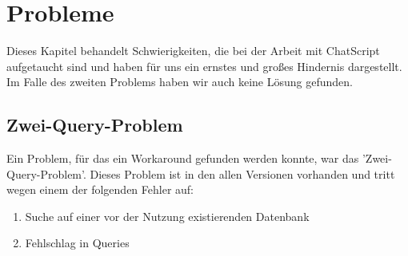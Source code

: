 \chapter{Probleme}
\label{sec:Probleme}

Dieses Kapitel behandelt Schwierigkeiten, die bei der Arbeit mit ChatScript aufgetaucht sind und haben für uns ein ernstes und großes Hindernis dargestellt. Im Falle des zweiten Problems haben wir auch keine Lösung gefunden.\\


\section{Zwei-Query-Problem}
\label{Section: Zwei-Query Problem}

Ein Problem, für das ein Workaround gefunden werden konnte, war das 'Zwei-Query-Problem'. Dieses Problem ist in den allen Versionen vorhanden und tritt wegen einem der folgenden Fehler auf:

\begin{enumerate}
\item {Suche auf einer vor der Nutzung existierenden Datenbank}
\item {Fehlschlag in Queries}
\end{enumerate}  


